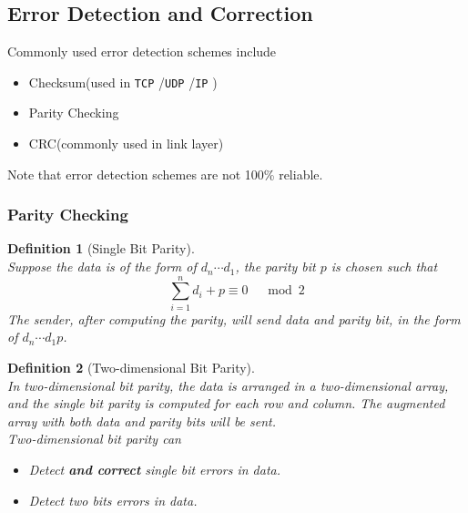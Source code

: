 \documentclass[12pt]{article}
\newcommand\TCP{\texttt{TCP} }
\newcommand\UDP{\texttt{UDP} }
\newcommand\IP{\texttt{IP} }
\newtheorem{definition}{Definition}[section]
\theoremstyle{definition}
\begin{document}
\subsection{Error Detection and Correction}
Commonly used error detection schemes include
\begin{itemize}
  \item Checksum(used in \TCP/\UDP/\IP)
  \item Parity Checking
  \item CRC(commonly used in link layer)
\end{itemize}
Note that error detection schemes are not 100\% reliable.
\subsubsection{Parity Checking}
\begin{definition}[Single Bit Parity]
\hfill\\\normalfont Suppose the data is of the form of $d_n\cdots d_1$, the parity bit $p$ is chosen such that
\[
\sum_{i=1}^n d_i + p \equiv 0 \;\;\;\mod 2
\]
The sender, after computing the parity, will send data and parity bit, in the form of $d_n\cdots d_1 p$.
\end{definition}
\begin{definition}[Two-dimensional Bit Parity]
\hfill\\\normalfont In two-dimensional bit parity, the data is arranged in a two-dimensional array, and the single bit parity is computed for each row and column. The augmented array with both data and parity bits will be sent.\\Two-dimensional bit parity can
\begin{itemize}
  \item Detect \textbf{and correct} single bit errors in data.
  \item Detect two bits errors in data.
\end{itemize} 
\end{definition}
\end{document}
